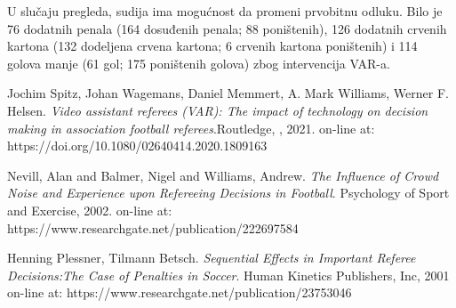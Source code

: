 \documentclass[a4paper]{article}
\begin{document}
U slučaju pregleda, sudija ima mogućnost da promeni prvobitnu odluku. Bilo je 76 dodatnih penala (164 dosuđenih penala; 88 poništenih), 126 dodatnih crvenih kartona (132 dodeljena crvena kartona; 6 crvenih kartona poništenih) i 114 golova manje (61 gol; 175 poništenih golova) zbog intervencija VAR-a.



\appendix

\begin{thebibliography}{9}

\bibitem{} Jochim Spitz, Johan Wagemans, Daniel Memmert, A. Mark Williams, Werner F. Helsen. \emph{Video assistant referees (VAR): The impact of technology on decision making in association football referees}.Routledge, , 2021. on-line at: https://doi.org/10.1080/02640414.2020.1809163

\bibitem{} Nevill, Alan and Balmer, Nigel and Williams, Andrew. \emph{The Influence of Crowd Noise and Experience upon Refereeing Decisions in Football}. Psychology of Sport and Exercise, 2002. on-line at: https://www.researchgate.net/publication/222697584

\bibitem{} Henning Plessner, Tilmann Betsch. \emph{Sequential Effects in Important Referee Decisions:The Case of Penalties in Soccer}. Human Kinetics Publishers, Inc, 2001 on-line at: https://www.researchgate.net/publication/23753046


\end{thebibliography}
\end{document}
